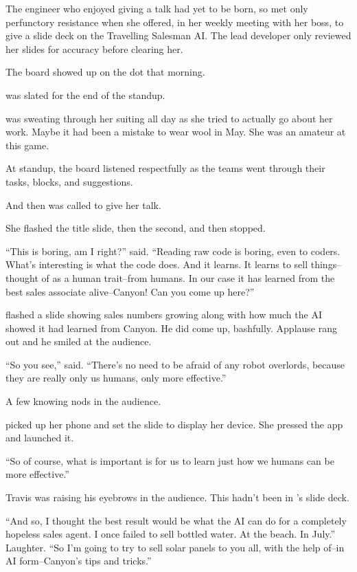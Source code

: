 The engineer who enjoyed giving a talk had yet to be born, so {\protag} met only perfunctory resistance when she offered, in her weekly meeting with her boss, to give a slide deck on the Travelling Salesman AI. The lead developer only reviewed her slides for accuracy before clearing her.

The board showed up on the dot that morning.

{\protag} was slated for the end of the standup.

{\protag} was sweating through her suiting all day as she tried to actually go about her work. Maybe it had been a mistake to wear wool in May. She was an amateur at this game.

At standup, the board listened respectfully as the teams went through their tasks, blocks, and suggestions.

And then {\protag} was called to give her talk.

She flashed the title slide, then the second, and then stopped.

``This is boring, am I right?'' {\protag} said. ``Reading raw code is boring, even to coders. What's interesting is what the code does. And it learns. It learns to sell things--thought of as a human trait--from humans. In our case it has learned from the best sales associate alive--Canyon! Can you come up here?''

{\protag} flashed a slide showing sales numbers growing along with how much the AI showed it had learned from Canyon. He did come up, bashfully. Applause rang out and he smiled at the audience.

``So you see,'' {\protag} said. ``There's no need to be afraid of any robot overlords, because they are really only us humans, only more effective.''

A few knowing nods in the audience.

{\protag} picked up her phone and set the slide to display her device. She pressed the app and launched it.

``So of course, what is important is for us to learn just how we humans can be more effective.''

Travis was raising his eyebrows in the audience. This hadn't been in {\protag}'s slide deck.

``And so, I thought the best result would be what the AI can do for a completely hopeless sales agent. I once failed to sell bottled water. At the beach. In July.'' Laughter. ``So I'm going to try to sell solar panels to you all, with the help of--in AI form--Canyon's tips and tricks.''

